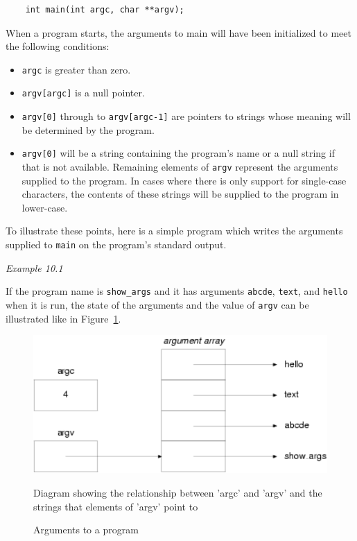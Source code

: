   \begin{Verbatim}
    int main(int argc, char **argv);
  \end{Verbatim}

  When a program starts, the arguments to main will have been initialized
   to meet the following conditions:


  \begin{itemize}
   \item \texttt{argc} is greater than zero.

   \item \texttt{argv[argc]} is a null pointer.

   \item \texttt{argv[0]} through to \texttt{argv[argc-1]} are
    pointers to strings whose meaning will be determined by the
    program.

   \item \texttt{argv[0]} will be a string containing the program's name
    or a null string if that is not available. Remaining elements of
    \texttt{argv} represent the arguments supplied to the program. In
    cases where there is only support for single-case characters, the
    contents of these strings will be supplied to the program in
    lower-case.
  \end{itemize}

  To illustrate these points, here is a simple program which writes the
   arguments supplied to \texttt{main} on the program's standard
   output.


   \begin{center}\textit{Example 10.1}\end{center}


  If the program name is \texttt{show\_args} and it has arguments
   \texttt{abcde}, \texttt{text}, and \texttt{hello} when it is
   run, the state of the arguments and the value of \texttt{argv} can be
   illustrated like in Figure~\ref{fig:argPrg}.


   \begin{figure}\centering
     \includegraphics[type=pdf,read=.pdf,ext=.pdf,scale=0.9]
     {figure/10.1_argPrg}
     \caption*{Diagram showing the relationship between 'argc' and 'argv'                and the strings that elements of 'argv' point to}
     \caption{\label{fig:argPrg}Arguments to a program}
   \end{figure}


